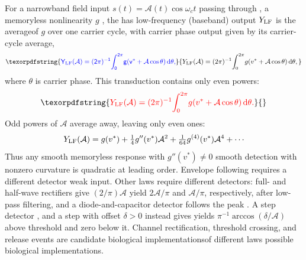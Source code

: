 \documentclass[11pt,a4paper]{article}
\providecommand{\DIFaddtex}[1]{{\protect\color{blue} \sf #1}} %
\providecommand{\DIFdeltex}[1]{{\protect\color{red} \scriptsize #1}} %
\providecommand{\DIFaddbegin}{} %
\providecommand{\DIFaddend}{} %
\providecommand{\DIFdelbegin}{} %
\providecommand{\DIFdelend}{} %
\providecommand{\DIFadd}[1]{\texorpdfstring{\DIFaddtex{#1}}{#1}} %
\providecommand{\DIFdel}[1]{\texorpdfstring{\DIFdeltex{#1}}{}} %
\begin{document}
\DIFdelend For a narrowband \DIFdelbegin \DIFdel{field }\DIFdelend \DIFaddbegin \DIFadd{input }\DIFaddend $s(t)=\mathcal A(t)\cos\omega_c t$\DIFdelbegin \DIFdel{passing through }\DIFdelend \DIFaddbegin \DIFadd{, }\DIFaddend a memoryless
nonlinearity $g$ \DIFdelbegin \DIFdel{, the }\DIFdelend \DIFaddbegin \DIFadd{has }\DIFaddend low-frequency \DIFdelbegin \DIFdel{(baseband) output $Y_{\rm LF}$ is the averageof $g$ over one
carrier cycle,
with carrier phase}\DIFdelend \DIFaddbegin \DIFadd{output given by its carrier-cycle average,
}\[
\DIFadd{Y_{\rm LF}(\mathcal A)=(2\pi)^{-1}\!\int_0^{2\pi}\!g(v^*+\mathcal A\cos\theta)\,\mathrm{d}\theta,
}\]
\DIFadd{where }\DIFaddend $\theta$ \DIFaddbegin \DIFadd{is carrier phase. This transduction contains
only even powers}\DIFaddend :
\DIFdelbegin \[
\DIFdel{Y_{\rm LF}(\mathcal A)=(2\pi)^{-1}\!\int_0^{2\pi}\!g(v^*+\mathcal A\cos\theta)\,\mathrm{d}\theta.
}\]%
\DIFdel{Odd powers of $\mathcal A$ average away, leaving only even ones:
}\DIFdelend \begin{equation}
Y_{\rm LF}(\mathcal A)=g(v^*)+\tfrac14 g''(v^*)\mathcal A^2+\tfrac1{64}g^{(4)}(v^*)\mathcal A^4+\cdots
\label{eq:cycavg}
\end{equation}
Thus \DIFdelbegin \DIFdel{any smooth memoryless response with $g''(v^*)\ne0$ }\DIFdelend \DIFaddbegin \DIFadd{smooth detection with nonzero curvature }\DIFaddend is quadratic at \DIFdelbegin \DIFdel{leading order.
Envelope following requires a different detector}\DIFdelend \DIFaddbegin \DIFadd{weak input.
Other laws require different detectors}\DIFaddend : full- and half-wave rectifiers \DIFdelbegin \DIFdel{give $(2/\pi)\mathcal A$ }\DIFdelend \DIFaddbegin \DIFadd{yield
$2\mathcal A/\pi$ }\DIFaddend and $\mathcal A/\pi$, \DIFdelbegin \DIFdel{respectively,
after low-pass filtering, and }\DIFdelend a diode-and-capacitor detector
follows the peak\DIFdelbegin \DIFdel{.
A step detector }\DIFdelend \DIFaddbegin \DIFadd{, and a step }\DIFaddend with offset $\delta>0$ \DIFdelbegin \DIFdel{instead gives
}\DIFdelend \DIFaddbegin \DIFadd{yields
}\DIFaddend $\pi^{-1}\arccos(\delta/\mathcal A)$ above threshold and zero below\DIFdelbegin \DIFdel{it}\DIFdelend .
Channel rectification, threshold crossing, and release events are \DIFdelbegin \DIFdel{candidate
biological implementationsof different laws}\DIFdelend \DIFaddbegin \DIFadd{possible
biological implementations}\DIFaddend .
\end{document}
